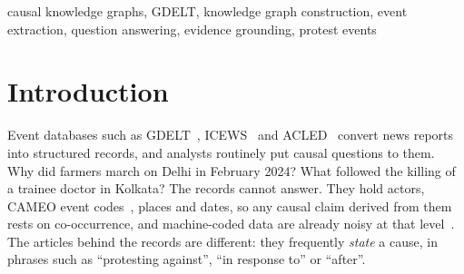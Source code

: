 \documentclass[conference]{IEEEtran}
\begin{document}
\begin{abstract}
GDELT records millions of events from world news, but it records what happened and not why. We
first show that causes cannot be read off its metadata: on 2024 Indian protest events, a
co-occurrence scorer over GDELT retained shuffled event pairs as often as genuine ones (4.0\%
against 3.8\%), and none of the 322 candidates it proposed was a cause supported by the source
text. We then present an algorithm that turns GDELT into a causal knowledge graph that can be
queried. It fetches the articles behind GDELT records, extracts events and grievances as verbatim
text spans, merges reports of the same event across articles, proposes candidate causes, and
accepts a link only when the article text states it, recording the exact supporting quotation. An
independent second annotation, constrained merging and cycle removal keep the graph consistent, and
a query algorithm answers ``why did this happen?'' and ``what did it lead to?'' with ranked cause
chains whose every step is quoted and sourced. The annotator is pluggable; we used a large language
model to make annotation fast. On 2{,}000 articles the algorithm built 1{,}416 sourced causal links
explaining 358 protests, while human verdicts per published link fell from 1.18 to 0.07. A random
human audit of 100 unreviewed links found 89 of 99 correct (95\% CI 82--94\%), including all 69
supported by explicit causal wording.
\end{abstract}

\begin{IEEEkeywords}
causal knowledge graphs, GDELT, knowledge graph construction, event extraction, question
answering, evidence grounding, protest events
\end{IEEEkeywords}

\section{Introduction}
Event databases such as GDELT~\cite{gdelt}, ICEWS~\cite{icews} and ACLED~\cite{acled} convert news
reports into structured records, and analysts routinely put causal questions to them. Why did farmers
march on Delhi in February 2024? What followed the killing of a trainee doctor in Kolkata? The
records cannot answer. They hold actors, CAMEO event codes~\cite{cameo}, places and dates, so any
causal claim derived from them rests on co-occurrence, and machine-coded data are already noisy at
that level~\cite{hammond}. The articles behind the records are different: they frequently
\emph{state} a cause, in phrases such as ``protesting against'', ``in response to'' or ``after''.
\end{document}
